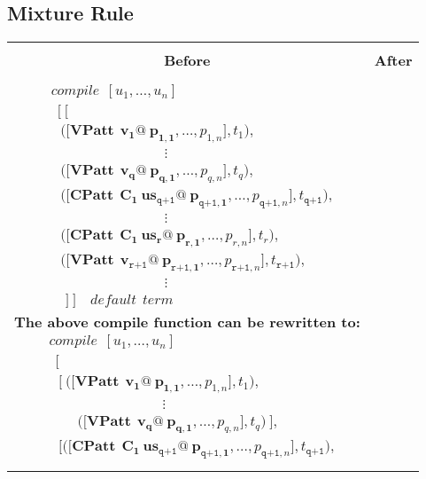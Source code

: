 \documentclass[11pt]{article}
\begin{document}
\subsection {Mixture Rule}\label{Pmatch:MixRule}
\begin{table}
\begin{center}
\begin{tabular}{|c|c|} \hline
{}& {}\\
{\bf Before} & {\bf After} \\ 
{}& {}\\
\hline
\begin{minipage}{2.6in}
{
\begin{align*} 
&compile~~[u_1,\ldots,u_n] \\
&~~ \Big[~\Big[\\
&~~~\Big(\Big[\mathbf{VPatt~~v_1@~p_{1,1}},\ldots, p_{1,n}\Big],t_1\Big), \\
&\qquad \qquad \qquad\qquad \vdots\qquad\qquad  \\ 
&~~~\Big(\Big[\mathbf{VPatt~~v_q@~p_{q,1}},\ldots, p_{q,n}\Big],t_q\Big), \\
&~~~\Big(\Big[\mathbf{CPatt~~C_1~us_{\texttt{q+1}}@~p_{\texttt{q+1},1}},\ldots, p_{\texttt{q+1},n}\Big],t_{\texttt{q+1}}\Big), \\
&\qquad \qquad \qquad\qquad \vdots\qquad\qquad  \\ 
&~~~\Big(\Big[\mathbf{CPatt~~C_1~us_{r}@~p_{r,1}},\ldots, p_{r,n}\Big],t_{r}\Big),\\
&~~~\Big(\Big[\mathbf{VPatt~~v_{\texttt{r+1}}@~p_{\texttt{r+1},1}},\ldots, p_{\texttt{r+1},n}\Big],t_{\texttt{r+1}}\Big), \\
&\qquad \qquad \qquad\qquad \vdots\qquad\qquad  \\ 
&\quad \Big]~\Big]\quad default~~term
\end{align*}
{\bf The above compile function can be rewritten to:}
\begin{align*} 
&compile~~[u_1,\ldots,u_n] \\
&~~ \Bigg[~\\ 
&~~~\Bigg[~\Big(\Big[\mathbf{VPatt~~v_1@~p_{1,1}},\ldots, p_{1,n}\Big],t_1\Big), \\
&\qquad \qquad \qquad\qquad \vdots\qquad\qquad  \\ 
&\qquad\Big(\Big[\mathbf{VPatt~~v_q@~p_{q,1}},\ldots, p_{q,n}\Big],t_q\Big)~\Bigg], \\
&~~~\Bigg[\Big(\Big[\mathbf{CPatt~~C_1~us_{\texttt{q+1}}@~p_{\texttt{q+1},1}},\ldots, p_{\texttt{q+1},n}\Big],t_{\texttt{q+1}}\Big), \\

\end{align*}}
\end{minipage}
\end{tabular}
\end{center}
\end{table}
\end{document}
